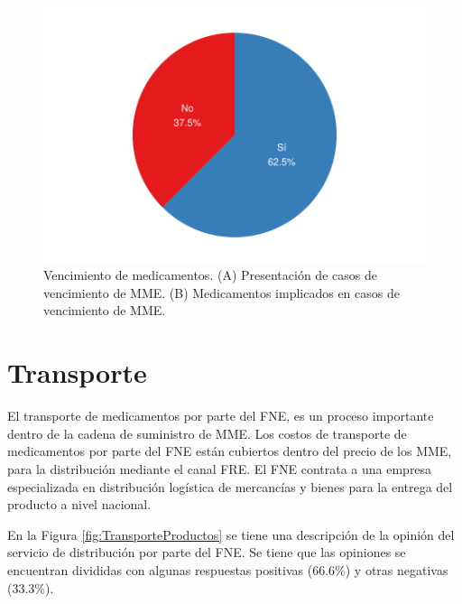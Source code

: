 \documentclass[
]{book}
\begin{document}
\begin{figure}[t]

{\centering \includegraphics[width=1\linewidth]{InformeFinal_files/figure-latex/CasosVencimiento1-1} 

}

\caption{Vencimiento de medicamentos. (A) Presentación de casos de vencimiento de MME. (B) Medicamentos implicados en casos de vencimiento de MME.}\label{fig:CasosVencimiento1}
\end{figure}

\hypertarget{transporte}{%
\section{Transporte}\label{transporte}}

El transporte de medicamentos por parte del FNE, es un proceso importante dentro de la cadena de suministro de MME. Los costos de transporte de medicamentos por parte del FNE están cubiertos dentro del precio de los MME, para la distribución mediante el canal FRE. El FNE contrata a una empresa especializada en distribución logística de mercancías y bienes para la entrega del producto a nivel nacional.

En la Figura \ref{fig:TransporteProductos} se tiene una descripción de la opinión del servicio de distribución por parte del FNE. Se tiene que las opiniones se encuentran divididas con algunas respuestas positivas (66.6\%) y otras negativas (33.3\%).
\end{document}
